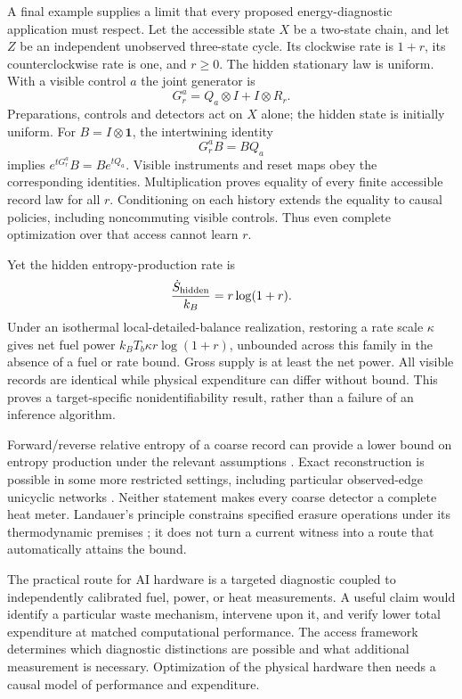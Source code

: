 A final example supplies a limit that every proposed energy-diagnostic
application must respect. Let the accessible state $X$ be a two-state chain,
and let $Z$ be an independent unobserved three-state cycle. Its clockwise
rate is $1+r$, its counterclockwise rate is one, and $r\geq0$. The hidden
stationary law is uniform. With a visible control $a$ the joint generator is
\begin{equation}
 G_r^a=Q_a\otimes I+I\otimes R_r.
\end{equation}
Preparations, controls and detectors act on $X$ alone; the hidden state is
initially uniform. For $B=I\otimes\mathbf1$, the intertwining identity
\begin{equation}
 G_r^aB=BQ_a
 \label{eq:applications-hidden-energy}
\end{equation}
implies $e^{tG_r^a}B=Be^{tQ_a}$. Visible instruments and reset maps obey the
corresponding identities. Multiplication proves equality of every finite
accessible record law for all $r$. Conditioning on each history extends the
equality to causal policies, including noncommuting visible controls. Thus
even complete optimization over that access cannot learn $r$.

Yet the hidden entropy-production rate is
\begin{equation}
 \frac{\dot S_{\rm hidden}}{k_B}=r\log(1+r).
\end{equation}
Under an isothermal local-detailed-balance realization, restoring a rate
scale $\kappa$ gives net fuel power
$k_BT_b\kappa r\log(1+r)$, unbounded across this family in the absence of a
fuel or rate bound. Gross supply is at least the net power. All visible
records are identical while physical expenditure can differ without bound.
This proves a target-specific nonidentifiability result, rather than a
failure of an inference algorithm.

Forward/reverse relative entropy of a coarse record can provide a lower
bound on entropy production under the relevant assumptions
\cite{physics-roldan}. Exact reconstruction is possible in some more
restricted settings, including particular observed-edge unicyclic networks
\cite{physics-vandermeer}. Neither statement makes every coarse detector a
complete heat meter. Landauer's principle constrains specified erasure
operations under its thermodynamic premises \cite{physics-landauer}; it does
not turn a current witness into a route that automatically attains the bound.

The practical route for AI hardware is a targeted diagnostic coupled to
independently calibrated fuel, power, or heat measurements. A useful claim
would identify a particular waste mechanism, intervene upon it, and verify
lower total expenditure at matched computational performance. The access
framework determines which diagnostic distinctions are possible and what
additional measurement is necessary. Optimization of the physical hardware
then needs a causal model of performance and expenditure.

